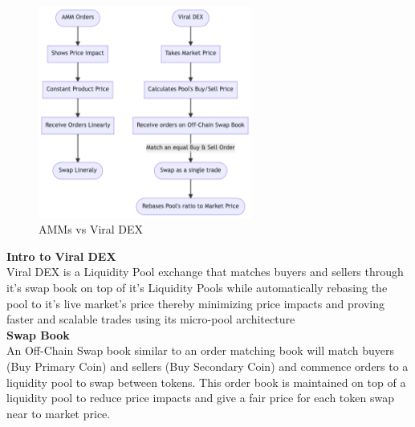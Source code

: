 \documentclass[10pt]{article}
\begin{document}
\begin{figure}[H]
\begin{center}
\includegraphics[width=7cm]{dex}
\caption{AMMs vs Viral DEX}
\end{center}
\end{figure}

\textbf{Intro to Viral DEX}\\

Viral DEX is a Liquidity Pool exchange that matches buyers and sellers through it's swap book on top of it's Liquidity Pools while automatically rebasing the pool to it's live market's price thereby minimizing price impacts and proving faster and scalable trades using its micro-pool architecture\\

\textbf{Swap Book}\\

An Off-Chain Swap book similar to an order matching book will match buyers (Buy Primary Coin) and sellers (Buy Secondary Coin) and commence orders to a liquidity pool to swap between tokens. This order book is maintained on top of a liquidity pool to reduce price impacts and give a fair price for each token swap near to market price. 
\end{document}
